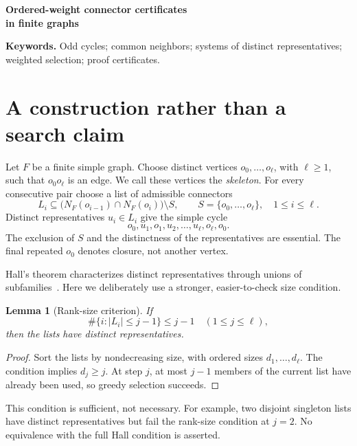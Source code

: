 \documentclass[11pt,letterpaper]{article}
\newtheorem{lemma}[theorem]{Lemma}
\theoremstyle{remark}\newtheorem{remark}[theorem]{Remark}
\newcommand{\dochead}[3]{\begin{center}{\LARGE\bfseries #1\par}\vspace{10pt}{\large Cecil Jentges\par}\vspace{3pt}{\small Independent researcher\par}\vspace{6pt}{\small #2\par}\vspace{3pt}{\small #3\par}\end{center}}
\begin{document}
\dochead{Ordered-weight connector certificates\\[3pt]in finite graphs}{A self-contained mathematical methods note}{12 October 2026 (UTC), version 1.1}
\begin{abstract}
We give a sufficient certificate for constructing an odd cycle from a prescribed closing edge and an ordered list of skeleton vertices. A highest-weight selection rule bounds retained low-weight vertices by a discarded-tail count. Ordering the interior skeleton then bounds the number of gaps incident to those vertices. Common-neighbor thresholds convert this bound into a greedy distinct-representative criterion. We prove the certificate, an exact run-count identity, a connector-deletion consequence, and a lower bound for labelled completions. An adjusted totient profile illustrates how a pairwise counting error can be absorbed into vertex weights in coprime graphs. All graph-theoretic statements proved here are self-contained. The note does not establish the full all-parameter arithmetic application and does not depend on its computational archive.
\end{abstract}
\noindent\textbf{Keywords.} Odd cycles; common neighbors; systems of distinct representatives; weighted selection; proof certificates.

\section{A construction rather than a search claim}
Let $F$ be a finite simple graph. Choose distinct vertices $o_0,\ldots,o_\ell$, with $\ell\ge1$, such that $o_0o_\ell$ is an edge. We call these vertices the \emph{skeleton}. For every consecutive pair choose a list of admissible connectors
\[
 L_i\subseteq\bigl(N_F(o_{i-1})\cap N_F(o_i)\bigr)\setminus S,
 \qquad S=\{o_0,\ldots,o_\ell\},\quad 1\le i\le\ell.
\]
Distinct representatives $u_i\in L_i$ give the simple cycle
\[
 o_0,u_1,o_1,u_2,\ldots,u_\ell,o_\ell,o_0.
\]
The exclusion of $S$ and the distinctness of the representatives are essential. The final repeated $o_0$ denotes closure, not another vertex.

Hall's theorem characterizes distinct representatives through unions of subfamilies~\cite{Hall}. Here we deliberately use a stronger, easier-to-check size condition.
\begin{lemma}[Rank-size criterion]\label{lem:rank}
If
\[
 \#\{i:|L_i|\le j-1\}\le j-1\quad(1\le j\le\ell),
\]
then the lists have distinct representatives.
\end{lemma}
\begin{proof}
Sort the lists by nondecreasing size, with ordered sizes $d_1,\ldots,d_\ell$. The condition implies $d_j\ge j$. At step $j$, at most $j-1$ members of the current list have already been used, so greedy selection succeeds.
\end{proof}
This condition is sufficient, not necessary. For example, two disjoint singleton lists have distinct representatives but fail the rank-size condition at $j=2$. No equivalence with the full Hall condition is asserted.
\end{document}
